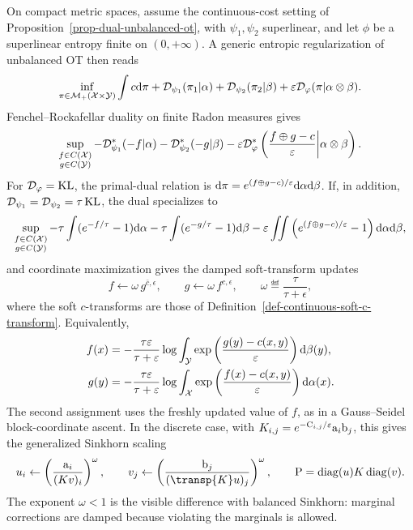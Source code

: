 On compact metric spaces, assume the continuous-cost setting of Proposition~\ref{prop-dual-unbalanced-ot}, with $\psi_1,\psi_2$ superlinear, and let $\phi$ be a superlinear entropy finite on $(0,+\infty)$. A generic entropic regularization of unbalanced OT then reads
\begin{equation}\label{eq-unbalanced-entropic-primal}
	\inf_{\pi\in\mathcal{M}_+(\mathcal{X}\times\mathcal{Y})}
	\int c\mathrm{d}\pi
	+
	\mathcal{D}_{\psi_1}(\pi_1|\alpha)
	+
	\mathcal{D}_{\psi_2}(\pi_2|\beta)
	+
	\varepsilon\mathcal{D}_\varphi(\pi|\alpha\otimes\beta).
\end{equation}
Fenchel--Rockafellar duality on finite Radon measures gives
\[
	\sup_{\substack{f\in C(\mathcal{X})\\g\in C(\mathcal{Y})}}
	-
	\mathcal{D}_{\psi_1}^*(-f|\alpha)
	-
	\mathcal{D}_{\psi_2}^*(-g|\beta)
	-
	\varepsilon\mathcal{D}_\varphi^*\left(\frac{f\oplus g-c}{\varepsilon}\middle|\alpha\otimes\beta\right).
\]
For $\mathcal{D}_\varphi=\operatorname{KL}$, the primal-dual relation is $\mathrm{d}\pi=e^{(f\oplus g-c)/\varepsilon}\mathrm{d}\alpha\mathrm{d}\beta$. If, in addition, $\mathcal{D}_{\psi_1}=\mathcal{D}_{\psi_2}=\tau\operatorname{KL}$, the dual specializes to
\[
	\sup_{\substack{f\in C(\mathcal{X})\\g\in C(\mathcal{Y})}}
	-\tau\int(e^{-f/\tau}-1)\mathrm{d}\alpha
	-\tau\int(e^{-g/\tau}-1)\mathrm{d}\beta
	-\varepsilon\iint
	\left(e^{(f\oplus g-c)/\varepsilon}-1\right)
	\mathrm{d}\alpha\mathrm{d}\beta,
\]
and coordinate maximization gives the damped soft-transform updates
\[
	f \leftarrow \omega\, g^{\bar c,\epsilon},
	\qquad
	g \leftarrow \omega\, f^{c,\epsilon},
	\qquad
	\omega\eqdef\frac{\tau}{\tau+\epsilon},
\]
where the soft $c$-transforms are those of Definition~\ref{def-continuous-soft-c-transform}. Equivalently,
\begin{align*}
	f(x)
	&=
	-
	\frac{\tau\varepsilon}{\tau+\varepsilon}
	\log\int_{\mathcal{Y}}
	\exp\left(\frac{g(y)-c(x,y)}{\varepsilon}\right)\mathrm{d}\beta(y),\\
	g(y)
	&=
	-
	\frac{\tau\varepsilon}{\tau+\varepsilon}
		\log\int_{\mathcal{X}}
		\exp\left(\frac{f(x)-c(x,y)}{\varepsilon}\right)\mathrm{d}\alpha(x).
\end{align*}
The second assignment uses the freshly updated value of $f$, as in a
Gauss--Seidel block-coordinate ascent.
In the discrete case, with $K_{i,j}=e^{-\mathrm{C}_{i,j}/\varepsilon}\mathrm{a}_i\mathrm{b}_j$, this gives the generalized Sinkhorn scaling
\[
	u_i\leftarrow \left(\frac{\a_i}{(K v)_i}\right)^\omega,
	\qquad
	v_j\leftarrow \left(\frac{\b_j}{(\transp{K}u)_j}\right)^\omega,
	\qquad
	\P=\diag(u)K\diag(v).
\]
The exponent $\omega<1$ is the visible difference with balanced Sinkhorn: marginal corrections are damped because violating the marginals is allowed.

